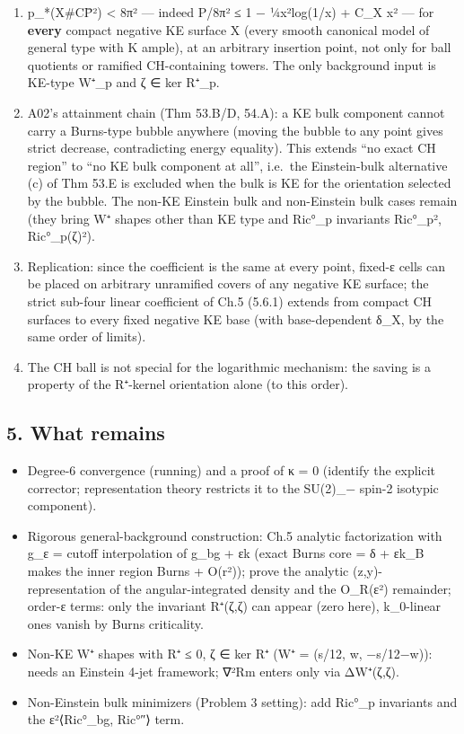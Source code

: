 \documentclass[
  10pt,
]{report}
\providecommand{\tightlist}{%
  \setlength{\itemsep}{0pt}\setlength{\parskip}{0pt}}
\begin{document}
\begin{enumerate}
\def\labelenumi{\arabic{enumi}.}
\tightlist
\item
  p\_*(X\#CP̄²) \textless{} 8π² --- indeed P/8π² ≤ 1 − ¼x²log(1/x) + C\_X
  x² --- for \textbf{every} compact negative KE surface X (every smooth
  canonical model of general type with K ample), at an arbitrary
  insertion point, not only for ball quotients or ramified CH-containing
  towers. The only background input is KE-type W⁺\_p and ζ ∈ ker R⁺\_p.
\item
  A02's attainment chain (Thm 53.B/D, 54.A): a KE bulk component cannot
  carry a Burns-type bubble anywhere (moving the bubble to any point
  gives strict decrease, contradicting energy equality). This extends
  ``no exact CH region'' to ``no KE bulk component at all'', i.e.~the
  Einstein-bulk alternative (c) of Thm 53.E is excluded when the bulk is
  KE for the orientation selected by the bubble. The non-KE Einstein
  bulk and non-Einstein bulk cases remain (they bring W⁺ shapes other
  than KE type and Ric°\_p invariants \textbar Ric°\_p\textbar²,
  \textbar Ric°\_p(ζ)\textbar²).
\item
  Replication: since the coefficient is the same at every point, fixed-ε
  cells can be placed on arbitrary unramified covers of any negative KE
  surface; the strict sub-four linear coefficient of Ch.5 (5.6.1)
  extends from compact CH surfaces to every fixed negative KE base (with
  base-dependent δ\_X, by the same order of limits).
\item
  The CH ball is not special for the logarithmic mechanism: the saving
  is a property of the R⁺-kernel orientation alone (to this order).
\end{enumerate}

\hypertarget{what-remains}{%
\subsection{5. What remains}\label{what-remains}}

\begin{itemize}
\tightlist
\item
  Degree-6 convergence (running) and a proof of κ = 0 (identify the
  explicit corrector; representation theory restricts it to the SU(2)\_−
  spin-2 isotypic component).
\item
  Rigorous general-background construction: Ch.5 analytic factorization
  with g\_ε = cutoff interpolation of g\_bg + εk (exact Burns core = δ +
  εk\_B makes the inner region Burns + O(r²)); prove the analytic
  (z,y)-representation of the angular-integrated density and the
  O\_R(ε²) remainder; order-ε terms: only the invariant R⁺(ζ,ζ) can
  appear (zero here), k\_0-linear ones vanish by Burns criticality.
\item
  Non-KE W⁺ shapes with R⁺ ≤ 0, ζ ∈ ker R⁺ (W⁺ = (\textbar s\textbar/12,
  w, −\textbar s\textbar/12−w)): needs an Einstein 4-jet framework; ∇²Rm
  enters only via ΔW⁺(ζ,ζ).
\item
  Non-Einstein bulk minimizers (Problem 3 setting): add Ric°\_p
  invariants and the ε²⟨Ric°\_bg, Ric°″⟩ term.
\end{itemize}
\end{document}
